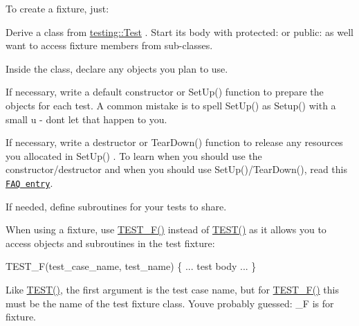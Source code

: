 To create a fixture, just\+:
\begin{DoxyEnumerate}
\item Derive a class from {\ttfamily \hyperlink{classtesting_1_1Test}{testing\+::\+Test}} . Start its body with {\ttfamily protected\+:} or {\ttfamily public\+:} as we\textquotesingle{}ll want to access fixture members from sub-\/classes.
\end{DoxyEnumerate}
\begin{DoxyEnumerate}
\item Inside the class, declare any objects you plan to use.
\end{DoxyEnumerate}
\begin{DoxyEnumerate}
\item If necessary, write a default constructor or {\ttfamily Set\+Up()} function to prepare the objects for each test. A common mistake is to spell {\ttfamily Set\+Up()} as {\ttfamily Setup()} with a small {\ttfamily u} -\/ don\textquotesingle{}t let that happen to you.
\end{DoxyEnumerate}
\begin{DoxyEnumerate}
\item If necessary, write a destructor or {\ttfamily Tear\+Down()} function to release any resources you allocated in {\ttfamily Set\+Up()} . To learn when you should use the constructor/destructor and when you should use {\ttfamily Set\+Up()/\+Tear\+Down()}, read this \href{V1_5_FAQ.md#should-i-use-the-constructordestructor-of-the-test-fixture-or-the-set-uptear-down-function}{\tt F\+AQ entry}.
\end{DoxyEnumerate}
\begin{DoxyEnumerate}
\item If needed, define subroutines for your tests to share.
\end{DoxyEnumerate}

When using a fixture, use {\ttfamily \hyperlink{gtest_8h_a0ee66d464d1a06c20c1929cae09d8758}{T\+E\+S\+T\+\_\+\+F()}} instead of {\ttfamily \hyperlink{gtest_8h_ad8b332753515c0ab8baada563c2547eb}{T\+E\+S\+T()}} as it allows you to access objects and subroutines in the test fixture\+: 
\begin{DoxyCode}
TEST\_F(test\_case\_name, test\_name) \{
 ... test body ...
\}
\end{DoxyCode}


Like {\ttfamily \hyperlink{gtest_8h_ad8b332753515c0ab8baada563c2547eb}{T\+E\+S\+T()}}, the first argument is the test case name, but for {\ttfamily \hyperlink{gtest_8h_a0ee66d464d1a06c20c1929cae09d8758}{T\+E\+S\+T\+\_\+\+F()}} this must be the name of the test fixture class. You\textquotesingle{}ve probably guessed\+: {\ttfamily \+\_\+F} is for fixture.

